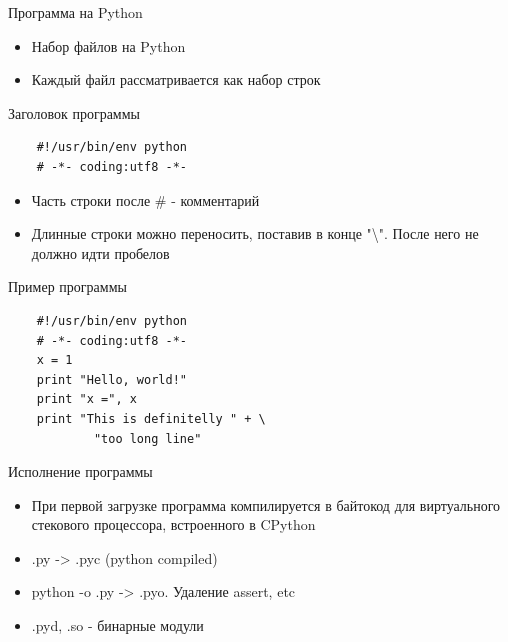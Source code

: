\documentclass{article}
\begin{document}
\begin{center} Программа на Python \end{center}
\begin{itemize}
    \item Набор файлов на Python
    \item Каждый файл рассматривается как набор строк
\end{itemize}
\begin{center} Заголовок программы \end{center}
\vspace{15pt}
\begin{lstlisting}
    #!/usr/bin/env python
    # -*- coding:utf8 -*-
\end{lstlisting}

\begin{itemize}
    \item Часть строки после \# - комментарий
    \item Длинные строки можно переносить, поставив в конце 
    		"\textbackslash". После него не должно идти пробелов
\end{itemize}
\newpage

\begin{center} Пример программы \end{center}
\vspace{15pt}
\begin{lstlisting}
    #!/usr/bin/env python
    # -*- coding:utf8 -*-
    x = 1
    print "Hello, world!"
    print "x =", x
    print "This is definitelly " + \
            "too long line"
\end{lstlisting}
\newpage

\begin{center} Исполнение программы \end{center}
\begin{itemize}
    \item При первой загрузке программа компилируется в байтокод для 
    	виртуального стекового процессора, встроенного в CPython
    \item .py -> .pyc (python compiled)
    \item python -o  .py -> .pyo. Удаление assert, etc
    \item .pyd, .so - бинарные модули
\end{itemize}
\newpage
\end{document}
